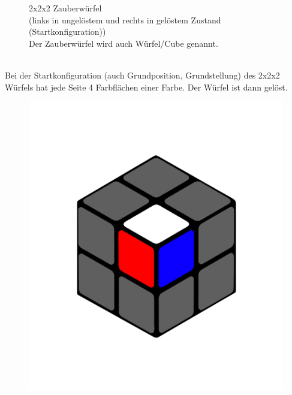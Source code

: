 \documentclass[12pt,a4paper, usenames, dvipsnames]{article}
\begin{document}
\begin{figure}[h]
\caption{2x2x2 Zauberwürfel \\ (links in ungelöstem und rechts in gelöstem Zustand (Startkonfiguration)) \\
Der Zauberwürfel wird auch Würfel/Cube genannt.}
\end{figure}
\ \\
Bei der Startkonfiguration (auch Grundposition, Grundstellung) des 2x2x2 Würfels hat jede Seite 4 Farbflächen einer Farbe. Der Würfel ist dann gelöst. \\

\begin{figure}[h]
\centering
\includegraphics[scale=0.1]{2x2stein.png}

\end{figure}
\end{document}

